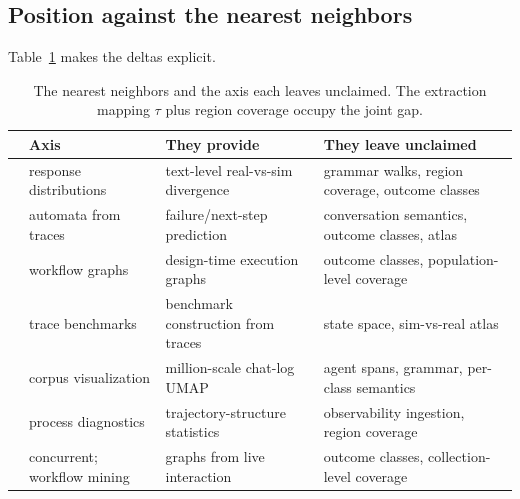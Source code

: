 \subsection{Position against the nearest neighbors}
Table~\ref{tab:neighbors} makes the deltas explicit.
\begin{table}[t]
\centering
\small
\begin{tabular}{@{}p{2.9cm}p{2.6cm}p{3.1cm}p{3.6cm}@{}}
\toprule
 & \textbf{Axis} & \textbf{They provide} & \textbf{They leave unclaimed} \\
\midrule
\citet{distributionalGap2026} &
  response distributions &
  text-level real-vs-sim divergence &
  grammar walks, region coverage, outcome classes \\
\citet{automataTraces2026} &
  automata from traces &
  failure/next-step prediction &
  conversation semantics, outcome classes, atlas \\
\citet{graphoftrace2026} &
  workflow graphs &
  design-time execution graphs &
  outcome classes, population-level coverage \\
\citet{tracedance2026} &
  trace benchmarks &
  benchmark construction from traces &
  state space, sim-vs-real atlas \\
\citet{wildvis2024} &
  corpus visualization &
  million-scale chat-log UMAP &
  agent spans, grammar, per-class semantics \\
\citet{resolveRate2026} &
  process diagnostics &
  trajectory-structure statistics &
  observability ingestion, region coverage \\
\citet{agenteval2026} &
  concurrent; workflow mining &
  graphs from live interaction &
  outcome classes, collection-level coverage \\
\bottomrule
\end{tabular}
\caption{The nearest neighbors and the axis each leaves unclaimed.
The extraction mapping $\tau$ plus region coverage occupy the joint gap.}
\label{tab:neighbors}
\end{table}

